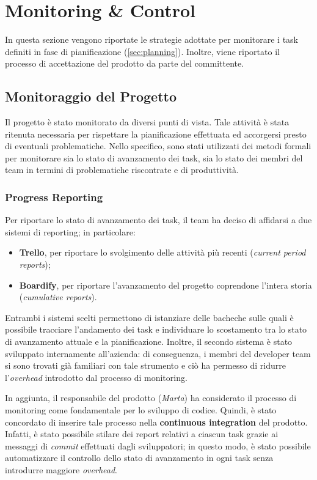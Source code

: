 \section{Monitoring \& Control}
\label{sec:monitoring}

In questa sezione vengono riportate le strategie adottate per monitorare i task definiti in fase di pianificazione (\ref{sec:planning}). Inoltre, viene riportato il processo di accettazione del prodotto da parte del committente.

\subsection{Monitoraggio del Progetto}
Il progetto è stato monitorato da diversi punti di vista. Tale attività è stata ritenuta necessaria per rispettare la pianificazione effettuata ed accorgersi presto di eventuali problematiche. Nello specifico, sono stati utilizzati dei metodi formali per monitorare sia lo stato di avanzamento dei task, sia lo stato dei membri del team in termini di problematiche riscontrate e di produttività.

\subsubsection{Progress Reporting}
Per riportare lo stato di avanzamento dei task, il team ha deciso di affidarsi a due sistemi di reporting; in particolare:
\begin{itemize}
    \item \textbf{Trello}, per riportare lo svolgimento delle attività più recenti (\textit{current period reports});
    \item \textbf{Boardify}, per riportare l'avanzamento del progetto coprendone l'intera storia (\textit{cumulative reports}).
\end{itemize}
Entrambi i sistemi scelti permettono di istanziare delle bacheche sulle quali è possibile tracciare l'andamento dei task e individuare lo scostamento tra lo stato di avanzamento attuale e la pianificazione. Inoltre, il secondo sistema è stato sviluppato internamente all'azienda: di conseguenza, i membri del developer team si sono trovati già familiari con tale strumento e ciò ha permesso di ridurre l'\textit{overhead} introdotto dal processo di monitoring.

In aggiunta, il responsabile del prodotto (\textit{Marta}) ha considerato il processo di monitoring come fondamentale per lo sviluppo di codice. Quindi, è stato concordato di inserire tale processo nella \textbf{continuous integration} del prodotto. Infatti, è stato possibile stilare dei report relativi a ciascun task grazie ai messaggi di \textit{commit} effettuati dagli sviluppatori; in questo modo, è stato possibile automatizzare il controllo dello stato di avanzamento in ogni task senza introdurre maggiore \textit{overhead}.


